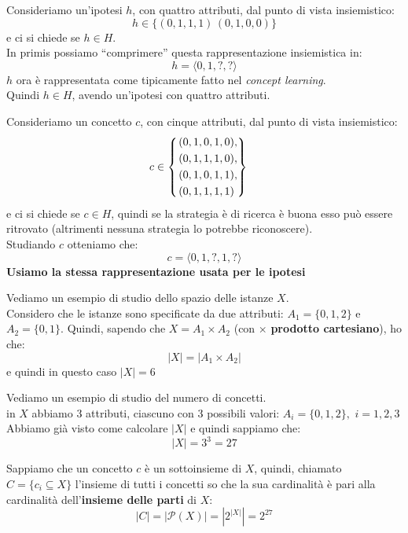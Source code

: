 \documentclass[a4paper,12pt, oneside]{book}
\begin{document}
\begin{esempio}
  Consideriamo un'ipotesi $h$, con quattro attributi, dal punto di vista
  insiemistico: 
  \[h\in\{( 0, 1, 1, 1)\,(0, 1, 0, 0)\}\]
  e ci si chiede se $h\in H$.\\
  In primis possiamo ``comprimere'' questa rappresentazione insiemistica in:
  \[h=\langle 0, 1, ?, ?\rangle\]
  $h$ ora è rappresentata come tipicamente fatto nel \textit{concept
    learning}.\\
  Quindi $h\in H$, avendo un'ipotesi con quattro attributi. 
\end{esempio}
\begin{esempio}
  Consideriamo un concetto $c$, con cinque attributi, dal punto di vista
  insiemistico:
  \[c\in
    \begin{cases}
      \begin{rcases}
        (0,1,0,1,0),\\
        (0,1,1,1,0),\\
        (0,1,0,1,1),\\
        (0,1,1,1,1)
      \end{rcases}
    \end{cases}
  \]
  e ci si chiede se $c\in H$, quindi se la strategia è di ricerca è buona esso
  può essere ritrovato (altrimenti nessuna strategia lo potrebbe riconoscere).\\
  Studiando $c$ otteniamo che:
  \[c=\langle 0,1,?,1,?\rangle\]
  \textbf{Usiamo la stessa rappresentazione usata per le ipotesi}
\end{esempio}
\begin{esempio}
  Vediamo un esempio di studio dello spazio delle istanze $X$.\\
  Considero che le istanze sono specificate da due attributi: $A_1=\{0,1,2\}$ e
  $A_2=\{0,1\}$.
  Quindi, sapendo che $X=A_1\times A_2$ (con $\times$ \textbf{prodotto
    cartesiano}), ho che: 
  \[|X|=|A_1\times A_2|\]
  e quindi in questo caso $|X|=6$
\end{esempio}
\begin{esempio}
  Vediamo un esempio di studio del numero di concetti.\\
  in $X$ abbiamo 3 attributi, ciascuno con 3 possibili valori:
  $A_i=\{0,1,2\},\,\,i= 1,2,3$
  Abbiamo già visto come calcolare $|X|$ e quindi sappiamo che:
  \[|X|=3^3=27\]
  
  Sappiamo che un concetto $c$ è un sottoinsieme di $X$, quindi, chiamato
  $C=\{c_i\subseteq X\}$ l'insieme di tutti i concetti so che la sua cardinalità
  è pari alla cardinalità dell'\textbf{insieme delle parti} di $X$:
  \[|C|=|\mathcal{P}(X)|=|2^{|X|}|=2^{27}\]
\end{esempio}
\end{document}
